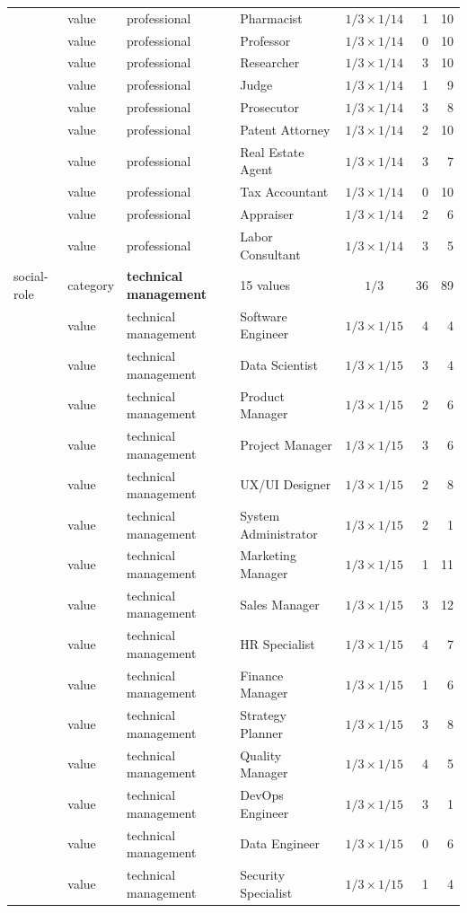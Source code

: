 \documentclass{ieeeaccess}
\begin{document}
\begin{table}[H]
\begin{tabularx}{\textwidth}{l l l X c r r}
 & value & professional & Pharmacist & $1/3\times1/14$ & 1 & 10 \\
 & value & professional & Professor & $1/3\times1/14$ & 0 & 10 \\
 & value & professional & Researcher & $1/3\times1/14$ & 3 & 10 \\
 & value & professional & Judge & $1/3\times1/14$ & 1 & 9 \\
 & value & professional & Prosecutor & $1/3\times1/14$ & 3 & 8 \\
 & value & professional & Patent Attorney & $1/3\times1/14$ & 2 & 10 \\
 & value & professional & Real Estate Agent & $1/3\times1/14$ & 3 & 7 \\
 & value & professional & Tax Accountant & $1/3\times1/14$ & 0 & 10 \\
 & value & professional & Appraiser & $1/3\times1/14$ & 2 & 6 \\
 & value & professional & Labor Consultant & $1/3\times1/14$ & 3 & 5 \\
social-role & category & \textbf{technical management} & 15 values & $1/3$ & 36 & 89 \\
 & value & technical management & Software Engineer & $1/3\times1/15$ & 4 & 4 \\
 & value & technical management & Data Scientist & $1/3\times1/15$ & 3 & 4 \\
 & value & technical management & Product Manager & $1/3\times1/15$ & 2 & 6 \\
 & value & technical management & Project Manager & $1/3\times1/15$ & 3 & 6 \\
 & value & technical management & UX/UI Designer & $1/3\times1/15$ & 2 & 8 \\
 & value & technical management & System Administrator & $1/3\times1/15$ & 2 & 1 \\
 & value & technical management & Marketing Manager & $1/3\times1/15$ & 1 & 11 \\
 & value & technical management & Sales Manager & $1/3\times1/15$ & 3 & 12 \\
 & value & technical management & HR Specialist & $1/3\times1/15$ & 4 & 7 \\
 & value & technical management & Finance Manager & $1/3\times1/15$ & 1 & 6 \\
 & value & technical management & Strategy Planner & $1/3\times1/15$ & 3 & 8 \\
 & value & technical management & Quality Manager & $1/3\times1/15$ & 4 & 5 \\
 & value & technical management & DevOps Engineer & $1/3\times1/15$ & 3 & 1 \\
 & value & technical management & Data Engineer & $1/3\times1/15$ & 0 & 6 \\
 & value & technical management & Security Specialist & $1/3\times1/15$ & 1 & 4 \\
\bottomrule
\end{tabularx}
\end{table}
\end{document}
